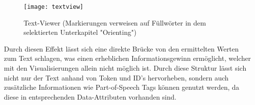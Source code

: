 \begin{figure}[!htbp]
 \centering
 \texttt{[image: textview]}
 \caption{Text-Viewer (Markierungen verweisen auf F\"ullw\"orter in dem selektierten Unterkapitel "Orienting")}
 \label{fig:sunburst}
\end{figure}

Durch diesen Effekt lässt sich eine direkte Brücke von den ermittelten Werten zum Text schlagen, was einen erheblichen Informationsgewinn ermöglicht, welcher mit den Visualisierungen allein nicht möglich ist. Durch diese Struktur lässt sich nicht nur der Text anhand von Token und ID's hervorheben, sondern auch zusätzliche Informationen wie Part-of-Speech Tags können genutzt werden, da diese in entsprechenden Data-Attributen vorhanden sind.